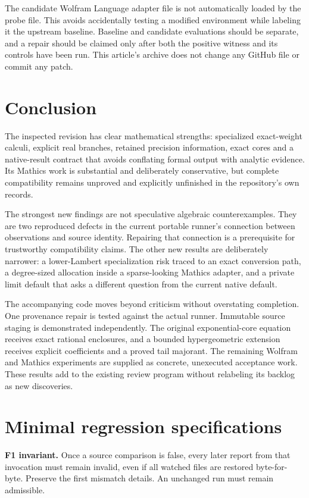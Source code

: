 \documentclass[11pt,letterpaper]{article}
\begin{document}
The candidate Wolfram Language adapter file is not automatically loaded by the probe file. This avoids accidentally testing a modified environment while labeling it the upstream baseline. Baseline and candidate evaluations should be separate, and a repair should be claimed only after both the positive witness and its controls have been run. This article's archive does not change any GitHub file or commit any patch.

\section{Conclusion}

The inspected revision has clear mathematical strengths: specialized exact-weight calculi, explicit real branches, retained precision information, exact cores and a native-result contract that avoids conflating formal output with analytic evidence. Its Mathics work is substantial and deliberately conservative, but complete compatibility remains unproved and explicitly unfinished in the repository's own records.

The strongest new findings are not speculative algebraic counterexamples. They are two reproduced defects in the current portable runner's connection between observations and source identity. Repairing that connection is a prerequisite for trustworthy compatibility claims. The other new results are deliberately narrower: a lower-Lambert specialization risk traced to an exact conversion path, a degree-sized allocation inside a sparse-looking Mathics adapter, and a private limit default that asks a different question from the current native default.

The accompanying code moves beyond criticism without overstating completion. One provenance repair is tested against the actual runner. Immutable source staging is demonstrated independently. The original exponential-core equation receives exact rational enclosures, and a bounded hypergeometric extension receives explicit coefficients and a proved tail majorant. The remaining Wolfram and Mathics experiments are supplied as concrete, unexecuted acceptance work. These results add to the existing review program without relabeling its backlog as new discoveries.

\appendix
\section{Minimal regression specifications}

\textbf{F1 invariant.} Once a source comparison is false, every later report from that invocation must remain invalid, even if all watched files are restored byte-for-byte. Preserve the first mismatch details. An unchanged run must remain admissible.
\end{document}
